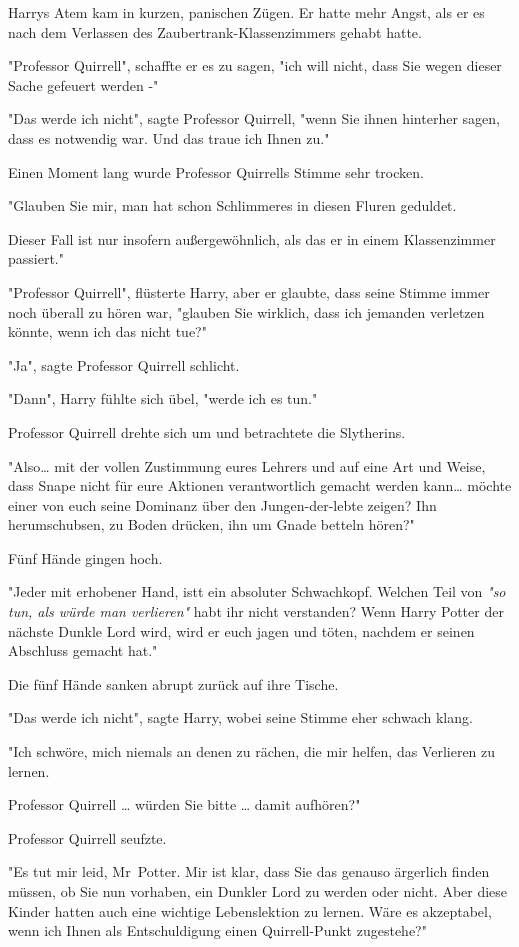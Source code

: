 {Harrys Atem kam in kurzen, panischen Zügen. Er hatte mehr Angst, als er es nach dem Verlassen des Zaubertrank-Klassenzimmers gehabt hatte.

"Professor Quirrell", schaffte er es zu sagen, "ich will nicht, dass Sie wegen dieser Sache gefeuert werden -"

"Das werde ich nicht", sagte Professor Quirrell, "wenn Sie ihnen hinterher sagen, dass es notwendig war. Und das traue ich Ihnen zu."

Einen Moment lang wurde Professor Quirrells Stimme sehr trocken.

"Glauben Sie mir, man hat schon Schlimmeres in diesen Fluren geduldet.

Dieser Fall ist nur insofern außergewöhnlich, als das er in einem Klassenzimmer passiert."

"Professor Quirrell", flüsterte Harry, aber er glaubte, dass seine Stimme immer noch überall zu hören war, "glauben Sie wirklich, dass ich jemanden verletzen könnte, wenn ich das nicht tue?"

"Ja", sagte Professor Quirrell schlicht.

"Dann", Harry fühlte sich übel, "werde ich es tun."

Professor Quirrell drehte sich um und betrachtete die Slytherins.

"Also… mit der vollen Zustimmung eures Lehrers und auf eine Art und Weise, dass Snape nicht für eure Aktionen verantwortlich gemacht werden kann… möchte einer von euch seine Dominanz über den Jungen-der-lebte zeigen? Ihn herumschubsen, zu Boden drücken, ihn um Gnade betteln hören?"

Fünf Hände gingen hoch.

"Jeder mit erhobener Hand, istt ein absoluter Schwachkopf. Welchen Teil von \emph{"so tun, als würde man verlieren"} habt ihr nicht verstanden? Wenn Harry Potter der nächste Dunkle Lord wird, wird er euch jagen und töten, nachdem er seinen Abschluss gemacht hat."

Die fünf Hände sanken abrupt zurück auf ihre Tische.

"Das werde ich nicht", sagte Harry, wobei seine Stimme eher schwach klang.

"Ich schwöre, mich niemals an denen zu rächen, die mir helfen, das Verlieren zu lernen.

Professor Quirrell … würden Sie bitte … damit aufhören?"

Professor Quirrell seufzte.

"Es tut mir leid, Mr~Potter. Mir ist klar, dass Sie das genauso ärgerlich finden müssen, ob Sie nun vorhaben, ein Dunkler Lord zu werden oder nicht. Aber diese Kinder hatten auch eine wichtige Lebenslektion zu lernen. Wäre es akzeptabel, wenn ich Ihnen als Entschuldigung einen Quirrell-Punkt zugestehe?"

}
